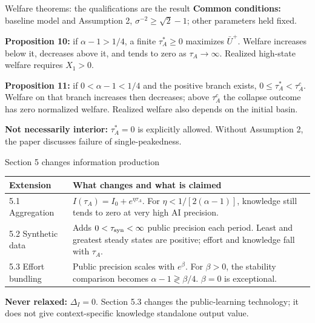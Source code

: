 \documentclass[11pt,aspectratio=169]{beamer}
\begin{document}
\begin{frame}{Welfare theorems: the qualifications are the result}
\small
\textbf{Common conditions:} baseline model and Assumption 2,
$\sigma^{-2}\geq\sqrt2-1$; other parameters held fixed.
\medskip

\textbf{Proposition 10:} if $\alpha-1>1/4$, a finite $\tau_A^*\geq0$ maximizes
$\bar U^+$. Welfare increases below it, decreases above it, and tends to zero
as $\tau_A\to\infty$. Realized high-state welfare requires $X_1>0$.
\medskip

\textbf{Proposition 11:} if $0<\alpha-1<1/4$ and the positive branch exists,
$0\leq\tau_A^*<\tau_A^c$. Welfare on that branch increases then decreases;
above $\tau_A^c$ the collapse outcome has zero normalized welfare.
Realized welfare also depends on the initial basin.
\medskip

\textbf{Not necessarily interior:} $\tau_A^*=0$ is explicitly allowed.
Without Assumption 2, the paper discusses failure of single-peakedness.
\end{frame}

\begin{frame}{Section 5 changes information production}
\small
\begin{tabular}{@{}p{}p{}@{}}
\toprule
Extension & What changes and what is claimed \\
\midrule
5.1 Aggregation & $I(\tau_A)=I_0+e^{\eta\tau_A}$. For $\eta<1/[2(\alpha-1)]$, knowledge still tends to zero at very high AI precision. \\[3mm]
5.2 Synthetic data & Adds $0<\tau_{\rm syn}<\infty$ public precision each period. Least and greatest steady states are positive; effort and knowledge fall with $\tau_A$. \\[3mm]
5.3 Effort bundling & Public precision scales with $e^\beta$. For $\beta>0$, the stability comparison becomes $\alpha-1\gtrless\beta/4$. $\beta=0$ is exceptional. \\
\bottomrule
\end{tabular}
\medskip

\textbf{Never relaxed:} $\Delta_I=0$. Section 5.3 changes the public-learning
technology; it does not give context-specific knowledge standalone output value.
\end{frame}
\end{document}
